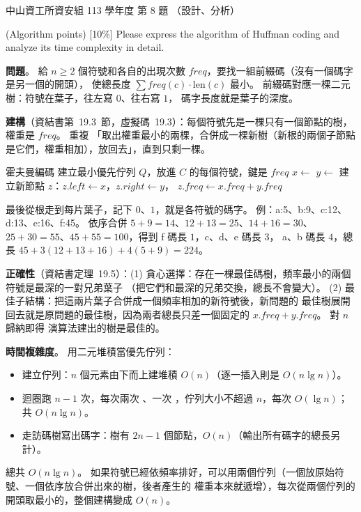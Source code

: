 \begin{pastexam}[label={px:nsysu-113-dmalg-08}]{中山資工所資安組 113 學年度 第 8 題}
（設計、分析）

(Algorithm points) {[10\%]} Please express the algorithm of Huffman coding and analyze its time complexity in
detail.
\end{pastexam}

\begin{pastsoln}
\textbf{問題}。 給 $n \ge 2$ 個符號和各自的出現次數 $\mathit{freq}$，要找一組前綴碼（沒有一個碼字是另一個的開頭），
使總長度 $\sum \mathit{freq}(c) \cdot \mathrm{len}(c)$ 最小。 前綴碼對應一棵二元樹：符號在葉子，往左寫 $0$、往右寫 $1$，
碼字長度就是葉子的深度。

\textbf{建構}（資結書第~19.3~節，虛擬碼~19.3）：每個符號先是一棵只有一個節點的樹，權重是 $\mathit{freq}$。 重複
「取出權重最小的兩棵，合併成一棵新樹（新根的兩個子節點是它們，權重相加），放回去」，直到只剩一棵。
\begin{pseudo}{霍夫曼編碼}
 
    \State 建立最小優先佇列 $Q$，放進 $C$ 的每個符號，鍵是 $\mathit{freq}$
        \State $x \gets$ 
        \State $y \gets$ 
        \State 建立新節點 $z$：$z.\mathit{left} \gets x$，$z.\mathit{right} \gets y$，
        $z.\mathit{freq} \gets x.\mathit{freq} + y.\mathit{freq}$
        \State {}
    \EndFor
    \State \Return {} 
\EndFunction
\end{pseudo}
最後從根走到每片葉子，記下 $0$、$1$，就是各符號的碼字。 例：a:5、b:9、c:12、d:13、e:16、f:45。 依序合併
$5 + 9 = 14$、$12 + 13 = 25$、$14 + 16 = 30$、$25 + 30 = 55$、$45 + 55 = 100$，得到 f 碼長 $1$，c、d、e 碼長 $3$，
a、b 碼長 $4$，總長 $45 + 3(12 + 13 + 16) + 4(5 + 9) = 224$。

\textbf{正確性}（資結書定理~19.5）：(1) 貪心選擇：存在一棵最佳碼樹，頻率最小的兩個符號是最深的一對兄弟葉子
（把它們和最深的兄弟交換，總長不會變大）。 (2) 最佳子結構：把這兩片葉子合併成一個頻率相加的新符號後，新問題的
最佳樹展開回去就是原問題的最佳樹，因為兩者總長只差一個固定的 $x.\mathit{freq} + y.\mathit{freq}$。 對 $n$ 歸納即得
演算法建出的樹是最佳的。

\textbf{時間複雜度}。 用二元堆積當優先佇列：
\begin{itemize}
\item 建立佇列：$n$ 個元素由下而上建堆積 $O(n)$（逐一插入則是 $O(n \lg n)$）。
\item 迴圈跑 $n - 1$ 次，每次兩次 、一次 ，佇列大小不超過 $n$，每次 $O(\lg n)$；
共 $O(n \lg n)$。
\item 走訪碼樹寫出碼字：樹有 $2n - 1$ 個節點，$O(n)$（輸出所有碼字的總長另計）。
\end{itemize}
總共 $O(n \lg n)$。 如果符號已經依頻率排好，可以用兩個佇列（一個放原始符號、一個依序放合併出來的樹，後者產生的
權重本來就遞增），每次從兩個佇列的開頭取最小的，整個建構變成 $O(n)$。
\end{pastsoln}
